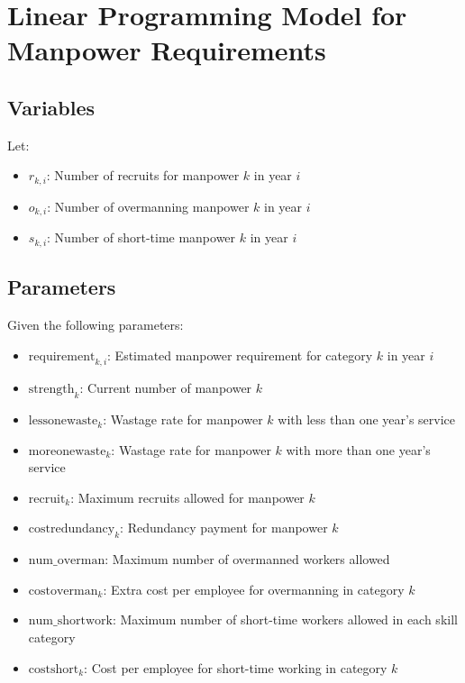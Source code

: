 \documentclass{article}
\begin{document}
\section*{Linear Programming Model for Manpower Requirements}

\subsection*{Variables}
Let:
\begin{itemize}
    \item \( r_{k,i} \): Number of recruits for manpower \( k \) in year \( i \)
    \item \( o_{k,i} \): Number of overmanning manpower \( k \) in year \( i \)
    \item \( s_{k,i} \): Number of short-time manpower \( k \) in year \( i \)
\end{itemize}

\subsection*{Parameters}
Given the following parameters:
\begin{itemize}
    \item \( \text{requirement}_{k,i} \): Estimated manpower requirement for category \( k \) in year \( i \)
    \item \( \text{strength}_{k} \): Current number of manpower \( k \)
    \item \( \text{lessonewaste}_{k} \): Wastage rate for manpower \( k \) with less than one year's service
    \item \( \text{moreonewaste}_{k} \): Wastage rate for manpower \( k \) with more than one year's service
    \item \( \text{recruit}_{k} \): Maximum recruits allowed for manpower \( k \)
    \item \( \text{costredundancy}_{k} \): Redundancy payment for manpower \( k \)
    \item \( \text{num\_overman} \): Maximum number of overmanned workers allowed
    \item \( \text{costoverman}_{k} \): Extra cost per employee for overmanning in category \( k \)
    \item \( \text{num\_shortwork} \): Maximum number of short-time workers allowed in each skill category
    \item \( \text{costshort}_{k} \): Cost per employee for short-time working in category \( k \)
\end{itemize}
\end{document}
